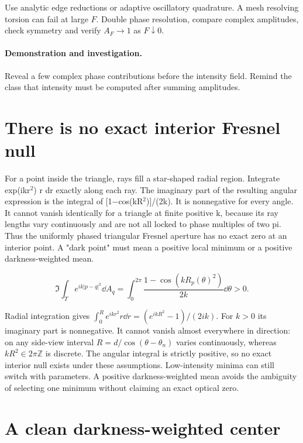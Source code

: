 \documentclass[11pt,oneside,openany]{book}
\begin{document}
Use analytic edge reductions or adaptive oscillatory quadrature.
A mesh resolving torsion can fail at large $F$.
Double phase resolution, compare complex amplitudes, check symmetry
and verify $A_F\to1$ as $F\downarrow0$.




\paragraph{Demonstration and investigation.} Reveal a few complex phase contributions before the intensity field. Remind the class that intensity must be computed after summing amplitudes.


\section{There is no exact interior Fresnel null}\label{sec:slide82}

For a point inside the triangle, rays fill a star-shaped radial region. Integrate exp(ikr\ensuremath{^2}) r dr exactly along each ray. The imaginary part of the resulting angular expression is the integral of [1\ensuremath{-}cos(kR\ensuremath{^2})]/(2k). It is nonnegative for every angle. It cannot vanish identically for a triangle at finite positive k, because its ray lengths vary continuously and are not all locked to phase multiples of two pi. Thus the uniformly phased triangular Fresnel aperture has no exact zero at an interior point. A "dark point" must mean a positive local minimum or a positive darkness-weighted mean.


\[\Im\int_Te^{ik|p-q|^2}\dd A_q=\int_0^{2\pi}\frac{1-\cos(kR_p(\theta)^2)}{2k}\dd\theta>0.\]



Radial integration gives
$\int_0^R e^{ikr^2}r\dd r=(e^{ikR^2}-1)/(2ik)$.
For $k>0$ its imaginary part is nonnegative.
It cannot vanish almost everywhere in direction: on any side-view
interval $R=d/\cos(\theta-\theta_n)$ varies continuously, whereas
$kR^2\in2\pi\mathbb Z$ is discrete. The angular integral is strictly
positive, so no exact interior null exists under these assumptions.
Low-intensity minima can still switch with parameters.
A positive darkness-weighted mean avoids the ambiguity of selecting
one minimum without claiming an exact optical zero.




\section{A clean darkness-weighted center}\label{sec:slide83}
\end{document}

